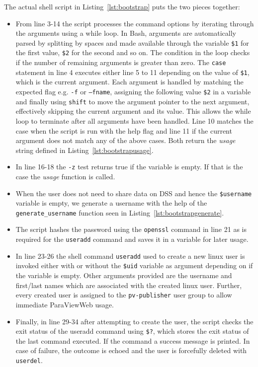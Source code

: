 

The actual shell script in Listing~\ref{lst:bootstrap} puts the two pieces
together:

\begin{itemize}
    \item From line 3-14 the script processes the command options by iterating
    through the arguments using a while loop. In Bash, arguments are
    automatically parsed by splitting by spaces and made available through the
    variable \texttt{\$1} for the first value, \texttt{\$2} for the second and
    so on. The condition in the loop checks if the number of remaining arguments
    is greater than zero. The \texttt{case} statement in line 4 executes either
    line 5 to 11 depending on the value of \texttt{\$1}, which is the current
    argument. Each argument is handled by matching the expected flag e.g.
    \texttt{-f} or \texttt{--fname}, assigning the following value \texttt{\$2}
    in a variable and finally using \texttt{shift} to move the argument pointer
    to the next argument, effectively skipping the current argument and its
    value. This allows the while loop to terminate after all arguments have been
    handled. Line 10 matches the case when the script is run with the help flag
    and line 11 if the current argument does not match any of the above cases.
    Both return the \textit{usage} string defined in
    Listing~\ref{lst:bootstrapusage}.
    \item In line 16-18 the \texttt{-z} test returns true if the variable is
    empty. If that is the case the \textit{usage} function is called.
    \item When the user does not need to share data on DSS and hence the
    \texttt{\$username} variable is empty, we generate a username with the help
    of the \texttt{generate\_username} function seen in
    Listing~\ref{lst:bootstrapgenerate}.
    \item The script hashes the password using the \texttt{openssl} command in
    line 21 as is required for the \texttt{useradd} command and saves it in a
    variable for later usage.
    \item In line 23-26 the shell command \texttt{useradd} used to create a new
    linux user is invoked either with or without the \texttt{\$uid} variable as
    argument depending on if the variable is empty. Other arguments provided are
    the username and first/last names which are associated with the created
    linux user. Further, every created user is assigned to the
    \texttt{pv-publisher} user group to allow immediate ParaViewWeb usage.
    \item Finally, in line 29-34 after attempting to create the user, the script
    checks the exit status of the useradd command using \texttt{\$?}, which
    stores the exit status of the last command executed. If the command a
    success message is printed. In case of failure, the outcome is echoed and
    the user is forcefully deleted with \texttt{userdel}.
\end{itemize}

